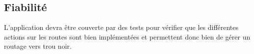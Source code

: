 \subsection{Fiabilité}
L'application devra être couverte par des tests pour vérifier que les différentes actions sur les routes sont bien implémentées et permettent donc bien de gérer un routage vers trou noir.



